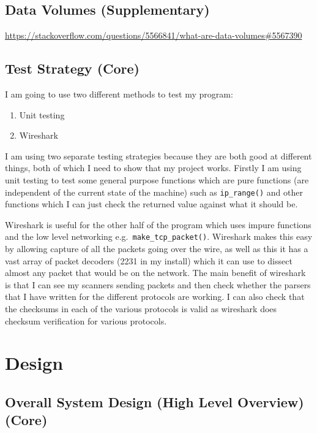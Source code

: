 \documentclass[titlepage]{article}
\begin{document}
\subsection{Data Volumes (Supplementary)}

\textbf{\color{red}{This seems to be about the volume of data stored in a database.}}
\href{https://stackoverflow.com/questions/5566841/what-are-data-volumes#5567390}{https://stackoverflow.com/questions/5566841/what-are-data-volumes\#5567390}

\subsection{Test Strategy (Core)}

I am going to use two different methods to test my program:
\begin{enumerate}
\item{Unit testing}
\item{Wireshark}
\end{enumerate}
I am using two separate testing strategies because they are both good at different things,
both of which I need to show that my project works. Firstly I am using unit testing to test
some general purpose functions which are pure functions (are independent of the current state
of the machine) such as \verb|ip_range()| and other functions which I can
just check the returned value against what it should be.

Wireshark is useful for the other half of the program which uses impure functions and the
low level networking e.g.\ \verb|make_tcp_packet()|. Wireshark makes this easy by allowing capture of all
the packets going over the wire, as well as this it has a vast array of packet decoders (2231 in my install)
which it can use to dissect almost any packet that would be on the network. The main
benefit of wireshark is that I can see my scanners sending packets and then check whether the parsers
that I have written for the different protocols are working. I can also check that the checksums
in each of the various protocols is valid as wireshark does checksum verification for various protocols.

\section{Design}

\subsection{Overall System Design (High Level Overview) (Core)}
\end{document}
